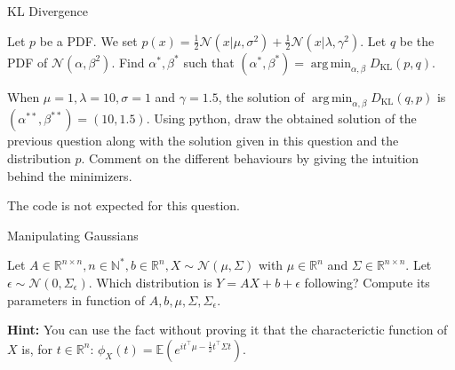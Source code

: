 \documentclass[
	ngerman,
	points=true,%
    solution=true,
    accentcolor=9c,
    colorbacktitle
	]{tudaexercise}
\DeclareMathOperator*{\argmin}{arg\,min}
\begin{document}
\begin{task}{KL Divergence}
\begin{subtask}
Let $p$ be a PDF. We set $p(x) = \frac{1}{2} \mathcal{N}(x| \mu, \sigma^2) + \frac{1}{2} \mathcal{N}(x|\lambda, \gamma^2)$. Let $q$ be the PDF of $\mathcal{N}(\alpha, \beta^2)$. Find $\alpha^*, \beta^*$ such that $(\alpha^*, \beta^*) = \argmin_{\alpha, \beta} D_{\text{KL}}(p, q)$.  
\end{subtask}
\begin{solution}

\end{solution}

\begin{subtask}
When $\mu = 1, \lambda = 10, \sigma = 1$ and $\gamma = 1.5$, the solution of $\argmin_{\alpha, \beta} D_{\text{KL}}(q, p)$ is $(\alpha^{**}, \beta^{**}) = (10, 1.5)$. Using python, draw the obtained solution of the previous question along with the solution given in this question and the distribution $p$. Comment on the different behaviours by giving the intuition behind the minimizers.

The code is not expected for this question.
\end{subtask}
\begin{solution}

\end{solution}
\end{task}

\begin{task}{Manipulating Gaussians}
\begin{subtask}
Let $A \in \mathbb{R}^{n \times n}, n \in \mathbb{N}^*, b \in \mathbb{R}^n, X \sim \mathcal{N}(\mu, \Sigma)$ with $\mu \in \mathbb{R}^n$ and $\Sigma \in \mathbb{R}^{n \times n}$. Let $\epsilon \sim \mathcal{N}(0, \Sigma_{\epsilon})$. Which distribution is $Y = AX + b + \epsilon$ following? Compute its parameters in function of $A, b, \mu, \Sigma, \Sigma_{\epsilon}$.

\textbf{Hint:} You can use the fact without proving it that the characterictic function of $X$ is, for $t \in \mathbb{R}^n$: $\phi_X(t) = \mathbb{E}(e^{it^{\intercal}\mu - \frac{1}{2}t^{\intercal}\Sigma t})$.
\end{subtask}
\begin{solution}

\end{solution}
\end{task}

\newpage
\end{document}
